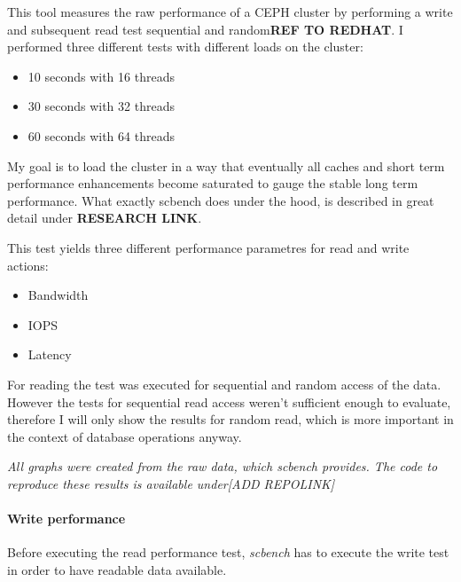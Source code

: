 \documentclass[titlepage, a4paper, 11pt]{scrartcl}
\begin{document}
            This tool measures the raw performance of a CEPH cluster by performing a write and subsequent read test sequential and random\textbf{REF TO REDHAT}.
            I performed three different tests with different loads on the cluster:

            \begin{itemize}
                \item 10 seconds with 16 threads
                \item 30 seconds with 32 threads
                \item 60 seconds with 64 threads
            \end{itemize}

            My goal is to load the cluster in a way that eventually all caches and short term performance enhancements become saturated to gauge the stable long term performance.
            What exactly scbench does under the hood, is described in great detail under \textbf{RESEARCH LINK}.

            This test yields three different performance parametres for read and write actions:

            \begin{itemize}
                \item Bandwidth
                \item IOPS
                \item Latency
            \end{itemize}

            For reading the test was executed for sequential and random access of the data. However the tests for sequential read access weren't sufficient enough to evaluate, therefore I will only show the results for random read, which is more important in the context of database operations anyway.

            \textit{All graphs were created from the raw data, which scbench provides. The code to reproduce these results is available under}\textit{[ADD REPOLINK]}

            \paragraph{Write performance}

                Before executing the read performance test, \textit{scbench} has to execute the write test in order to have readable data available.
\end{document}
